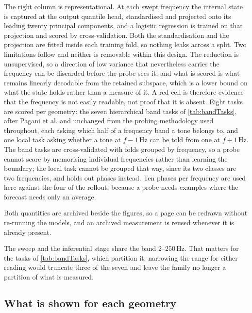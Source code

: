 The right column is representational. At each swept frequency the internal state is captured at the output quantile head, standardised and projected onto its leading twenty principal components, and a logistic regression is trained on that projection and scored by cross-validation. Both the standardisation and the projection are fitted inside each training fold, so nothing leaks across a split. Two limitations follow and neither is removable within this design. The reduction is unsupervised, so a direction of low variance that nevertheless carries the frequency can be discarded before the probe sees it; and what is scored is what remains linearly decodable from the retained subspace, which is a lower bound on what the state holds rather than a measure of it. A red cell is therefore evidence that the frequency is not easily readable, not proof that it is absent. Eight tasks are scored per geometry: the seven hierarchical band tasks of \autoref{tab:bandTasks}, after Pagani et al.\autocite{paganiPreliminaryInsightsChronos2026} and unchanged from the probing methodology used throughout, each asking which half of a frequency band a tone belongs to, and one local task asking whether a tone at $f-1$\,Hz can be told from one at $f+1$\,Hz. The band tasks are cross-validated with folds grouped by frequency, so a probe cannot score by memorising individual frequencies rather than learning the boundary; the local task cannot be grouped that way, since its two classes are two frequencies, and holds out phases instead. Ten phases per frequency are used here against the four of the rollout, because a probe needs examples where the forecast needs only an average.

Both quantities are archived beside the figures, so a page can be redrawn without re-running the models, and an archived measurement is reused whenever it is already present.

The sweep and the inferential stage share the band $2$--$250$\,Hz. That matters for the tasks of \autoref{tab:bandTasks}, which partition it: narrowing the range for either reading would truncate three of the seven and leave the family no longer a partition of what is measured.

\subsection{What is shown for each geometry}

